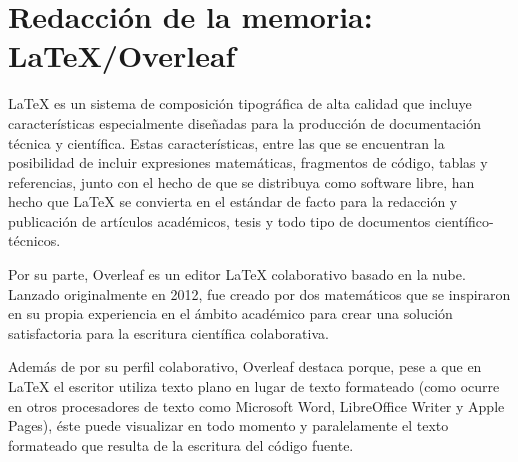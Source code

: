 \section{Redacción de la memoria: LaTeX/Overleaf}
\label{sec:redaccion_de_la_memoria}

LaTeX es un sistema de composición tipográfica de alta calidad que incluye características especialmente diseñadas para la producción de documentación técnica y científica. Estas características, entre las que se encuentran la posibilidad de incluir expresiones matemáticas, fragmentos de código, tablas y referencias, junto con el hecho de que se distribuya como software libre, han hecho que LaTeX se convierta en el estándar de facto para la redacción y publicación de artículos académicos, tesis y todo tipo de documentos científico-técnicos. 

Por su parte, Overleaf es un editor LaTeX colaborativo basado en la nube. Lanzado originalmente en 2012, fue creado por dos matemáticos que se inspiraron en su propia experiencia en el ámbito académico para crear una solución satisfactoria para la escritura científica colaborativa.

Además de por su perfil colaborativo, Overleaf destaca porque, pese a que en LaTeX el escritor utiliza texto plano en lugar de texto formateado (como ocurre en otros procesadores de texto como Microsoft Word, LibreOffice Writer y Apple Pages), éste puede visualizar en todo momento y paralelamente el texto formateado que resulta de la escritura del código fuente.
